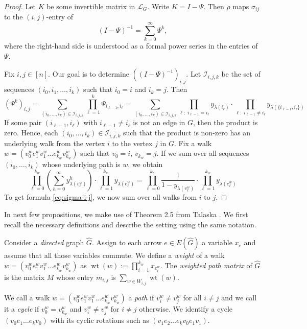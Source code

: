 \documentclass[a4paper, 11pt]{amsart}
\numberwithin{theorem}{section}
\newcommand{\aG}{\widehat{G}}
\newcommand{\wt}{\operatorname{wt}}
\begin{document}
\begin{proof}
    Let $K$ be some invertible matrix in $\mathcal L_G$. Write $K = I
    - \Psi$.  Then $\rho$ maps $\sigma_{ij}$ to the $(i,j)$-entry of 
    $$
        (I-\Psi)^{-1} = \sum_{k=0}^\infty \Psi^k,
    $$
    where the right-hand side is understood as a formal power series
    in the entries of $\Psi$.
    
    Fix $i,j\in [n]$. Our goal is to determine $\left((I-\Psi)^{-1}\right)_{i,j}$. Let $\mathcal I_{i,j,k}$ be the set of sequences $(i_0, i_1, \dots ,i_k)$ such that $i_0 = i$ and $i_k = j$. Then
    $$
        (\Psi^k)_{i,j} = \sum_{(i_0,\dots, i_k)\in \mathcal I_{i,j,k}}
	\prod_{\ell = 1}^{k} \Psi_{i_{\ell-1}, i_\ell} =
	\sum_{(i_0,\dots, i_k)\in \mathcal I_{i,j,k}} \prod_{\ell:
	\; i_{\ell-1} = i_\ell} y_{\lambda(i_\ell)} \cdot
	\prod_{\ell: \;  i_{\ell-1} \neq i_\ell}
	y_{\lambda(\{i_{\ell-1},i_\ell\})}
    $$
    If some pair $(i_{\ell-1},i_\ell)$ with $i_{\ell-1} \neq i_\ell$
    is not an edge in $G$, then the product is
    zero. Hence, each $(i_0,\dots, i_k)\in \mathcal I_{i,j,k}$ such
    that the product is non-zero has an underlying walk from the
    vertex $i$ to the vertex $j$ in $G$. Fix a walk $w =
    (v_0^we_1^wv_1^w\dots e_{k_w}^wv_{k_w}^w)$ such that $v_0 = i$,
    $v_{k_w} = j$. If we sum over all sequences $(i_0,\dots, i_k)$
    whose underlying path is $w$, we obtain
    $$
        \prod_{\ell=0}^{k_w}\left(\sum_{h=0}^\infty
	y_{\lambda(v_{\ell}^w)}^h\right)\cdot\prod_{\ell = 1}^{k_w}
	y_{\lambda(e_\ell^w)} = 
        \prod_{\ell=0}^{k_w} \frac{1}{1-y_{\lambda(v_\ell^w)}} 
\cdot\prod_{\ell = 1}^{k_w}
	y_{\lambda(e_\ell^w)} 
    $$
    To get formula \ref{eq:sigma-i-j}, we now sum over all walks from $i$ to $j$.
\end{proof}

In next few propositions, we make use of Theorem 2.5 from Talaska \cite{talaska2012}. We first recall the necessary definitions and describe the setting using the same notation.

Consider a {\em directed} graph $\aG$. Assign to each arrow $e\in
E(\aG)$ a
variable $x_e$ and assume that all those variables commute. We define
a \emph{weight} of a walk $w = (v_0^we_1^wv_1^w\dots
e_{k_w}^wv_{k_w}^w)$ as $\wt(w):= \prod_{i=1}^{k_w} x_{e_i^w}$. The
\emph{weighted path matrix} of $\aG$ is the matrix $M$ whose entry $m_{i,j}$ is $\sum_{w\in W_{i,j}} \wt(w)$.

We call a walk $w = (v_0^we_1^wv_1^w\dots e_{k_w}^wv_{k_w}^w)$ a
\emph{path} if $v_i^w\neq v_j^w$ for all $i\neq j$ and we call it a
\emph{cycle} if $v_0^w = v_{k_w}^w$ and $v_i^w\neq v_j^w$ for $i\neq
j$ otherwise. We identify a cycle $(v_0e_1\dots e_kv_0)$ with its
cyclic rotations such as $(v_1e_2\dots e_kv_0e_1 v_1)$.
\end{document}
